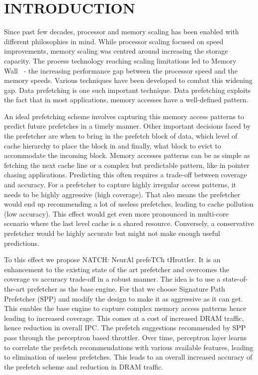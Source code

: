 \section{INTRODUCTION}
\label{Introduction}
Since past few decades, processor and memory scaling has been enabled
with different philosophies in mind.  While processor scaling focused
on speed improvements, memory scaling was centred around increasing
the storage capacity.  The process technology reaching scaling
limitations led to Memory Wall~\cite{MemWall} - the increasing
performance gap between the processor speed and the memory speeds.
Various techniques have been developed to combat this widening gap.
Data prefetching is one such important technique.  Data prefetching
exploits the fact that in most applications, memory accesses have a
well-defined pattern.

An ideal prefetching scheme involves capturing this memory access
patterns to predict future prefetches in a timely manner.  Other
important decisions faced by the prefetcher are when to bring in the
prefetch block of data, which level of cache hierarchy to place the
block in and finally, what block to evict to accommodate the incoming
block.  Memory accesses patterns can be as simple as fetching the next
cache line or a complex but predictable pattern, like in pointer
chasing applications.  Predicting this often requires a trade-off
between coverage and accuracy.  For a prefetcher to capture highly
irregular access patterns, it needs to be highly aggressive (high
coverage).  That also means the prefetcher would end up recommending a
lot of useless prefetches, leading to cache pollution (low accuracy).
This effect would get even more pronounced in multi-core scenario
where the last level cache is a shared resource.  Conversely, a
conservative prefetcher would be highly accurate but might not make
enough useful predictions.

To this effect we propose NATCH: NeurAl prefeTCh tHrottler.  It
is an enhancement to the existing state of the art prefetcher and
overcomes the coverage vs accuracy trade-off in a robust manner.  The
idea is to use a state-of-the-art prefetcher as the base engine.
For that we choose Signature Path Prefetcher (SPP) and 
modify the design to make it as aggressive as it can get.
This enables the base engine to capture complex memory access patterns hence
leading to increased coverage.  This comes at a cost of increased DRAM
traffic, hence reduction in overall IPC.  The prefetch suggestions
recommended by SPP pass through the perceptron based throttler. Over
time, perceptron layer learns to correlate the prefetch recommendations 
with various available features, leading to elimination of
useless prefetches. This leads to an overall increased accuracy of
the prefetch scheme and reduction in DRAM traffic.

